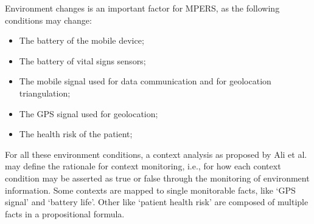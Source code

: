 Environment changes is an important factor for MPERS, as the following conditions may change:

\begin{itemize}

\item The battery of the mobile device;
\medskip

\item The battery of vital signs sensors;
\medskip

\item The mobile signal used for data communication and for geolocation triangulation;
\medskip

\item The GPS signal used for geolocation;
\medskip

\item The health risk of the patient;
\medskip

\end{itemize}

For all these environment conditions, a context analysis as proposed by Ali et al. may define the rationale for context monitoring, i.e., for how each context condition may be asserted as true or false through the monitoring of environment information. Some contexts are mapped to single monitorable facts, like `GPS signal' and `battery life'. Other like `patient health risk' are composed of multiple facts in a propositional formula.




